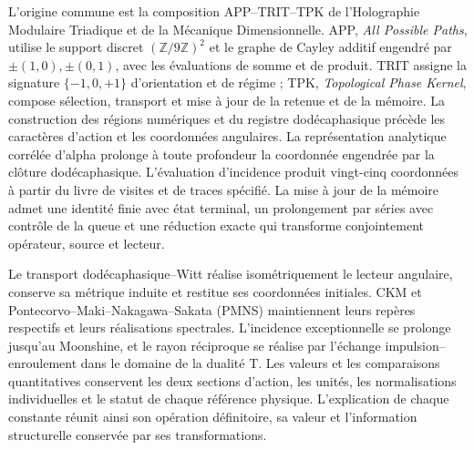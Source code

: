 L'origine commune est la composition APP--TRIT--TPK de l'Holographie Modulaire
Triadique et de la Mécanique Dimensionnelle. APP, \emph{All Possible Paths},
utilise le support discret \((\mathbb Z/9\mathbb Z)^2\) et le graphe
de Cayley additif engendré par \(\pm(1,0),\pm(0,1)\), avec les
évaluations de somme et de produit. TRIT assigne la signature \(\{-1,0,+1\}\)
d'orientation et de régime ; TPK, \emph{Topological Phase Kernel},
compose sélection, transport et mise à jour de la retenue et de la mémoire.
La construction
des régions numériques et du registre dodécaphasique précède les
caractères d'action et les coordonnées angulaires. La représentation
analytique corrélée d'alpha prolonge à toute profondeur la coordonnée
engendrée par la clôture dodécaphasique. L'évaluation d'incidence produit
vingt-cinq coordonnées à partir du livre de visites et de traces spécifié.
La mise à jour de la mémoire admet une identité finie avec état
terminal, un prolongement par séries avec contrôle de la queue et une réduction
exacte qui transforme conjointement opérateur, source et lecteur.

Le transport dodécaphasique--Witt réalise isométriquement le lecteur
angulaire, conserve sa métrique induite et restitue ses coordonnées initiales.
CKM et Pontecorvo--Maki--Nakagawa--Sakata (PMNS) maintiennent leurs
repères respectifs et leurs réalisations spectrales.
L'incidence exceptionnelle se prolonge jusqu'au Moonshine, et le rayon
réciproque se réalise par l'échange impulsion--enroulement dans
le domaine de la dualité T. Les valeurs et les comparaisons quantitatives
conservent les deux sections d'action, les unités, les normalisations
individuelles et le statut de chaque référence physique. L'explication de
chaque constante réunit ainsi son opération définitoire, sa valeur et
l'information structurelle conservée par ses transformations.

\vspace{2pt}

\par\endgroup
